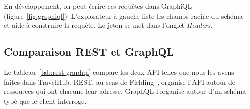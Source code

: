 En développement, on peut écrire ces requêtes dans GraphiQL (figure~\ref{fig:graphiql}). L'explorateur à gauche liste les champs racine du schéma et aide à construire la requête. Le jeton se met dans l'onglet \emph{Headers}.


\subsection{Comparaison REST et GraphQL}

Le tableau~\ref{tab:rest-graphql} compare les deux API telles que nous les avons faites dans TravelHub. REST, au sens de Fielding~\cite{fielding2000}, organise l'API autour de ressources qui ont chacune leur adresse. GraphQL l'organise autour d'un schéma typé que le client interroge.


